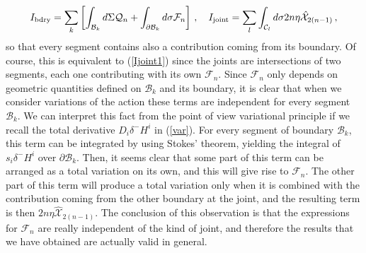 \documentclass[11pt,letterpaper]{article}
\newcommand{\dslash}{\delta^{\!\!\!\!-}\!}
\begin{document}
\begin{equation}\label{brjnt}
I_{\rm bdry}=\sum_{k}\left[\int_{\mathcal{B}_k}d\Sigma \mathcal{Q}_{n}+\int_{\partial\mathcal{B}_k}d\sigma \mathcal{F}_{n}\right]\, ,\quad I_{\rm joint}=\sum_{l}\int_{\mathcal{C}_l}d\sigma 2n\eta \hat{\mathcal{X}}_{2(n-1)}\, ,
\end{equation}
so that every segment contains also a contribution coming from its boundary. Of course, this is equivalent to (\ref{Ijoint1}) since the joints are intersections of two segments, each one contributing with its own $\mathcal{F}_n$. Since $\mathcal{F}_{n}$ only depends on geometric quantities defined on $\mathcal{B}_k$ and its boundary, it is clear that when we consider variations of the action these terms are independent for every segment $\mathcal{B}_k$. We can interpret this fact from the point of view variational principle if we recall the total derivative $D_i \dslash H^i$ in (\ref{var}). For every segment of boundary $\mathcal{B}_k$, this term can be integrated by using Stokes' theorem, yielding the integral of $s_i \dslash H^i$ over  $\partial\mathcal{B}_k$.  Then, it seems clear that some part of this term can be arranged as a total variation on its own, and this will give rise to $\mathcal{F}_n$. The other part of this term will produce a total variation only when it is combined with the contribution coming from the other boundary at the joint, and the resulting term is then $2n\eta \hat{\mathcal{X}}_{2(n-1)}$. The conclusion of this observation is that the expressions for $\mathcal{F}_n$ are really independent of the kind of joint, and therefore the results that we have obtained are actually valid in general.
\end{document}

